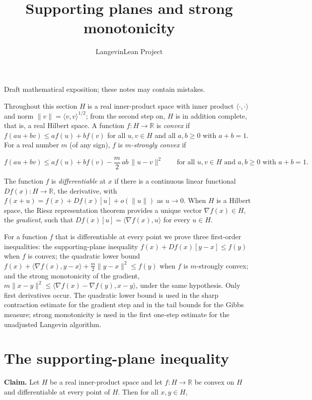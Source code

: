 \documentclass[11pt,a4paper]{article}
\title{\texorpdfstring{Supporting planes and strong monotonicity}{Supporting planes and strong monotonicity}}
\author{LangevinLean Project}
\date{}
\begin{document}
\maketitle
Draft mathematical exposition; these notes may contain mistakes.


Throughout this section \(H\) is a real inner-product space with inner product \(\langle\cdot,\cdot\rangle\) and norm \(\|v\|=\langle v,v\rangle^{1/2}\); from the second step on, \(H\) is in addition complete, that is, a real Hilbert space. A function \(f:H\to\mathbb R\) is \emph{convex} if \(f(au+bv)\le af(u)+bf(v)\) for all \(u,v\in H\) and all \(a,b\ge0\) with \(a+b=1\). For a real number \(m\) (of any sign), \(f\) is \emph{\(m\)-strongly convex} if


\[f(au+bv)\le af(u)+bf(v)-\frac m2\,ab\,\|u-v\|^2\qquad\text{for all }u,v\in H\text{ and }a,b\ge0\text{ with }a+b=1.\]


The function \(f\) is \emph{differentiable} at \(x\) if there is a continuous linear functional \(Df(x):H\to\mathbb R\), the derivative, with \(f(x+u)=f(x)+Df(x)[u]+o(\|u\|)\) as \(u\to0\). When \(H\) is a Hilbert space, the Riesz representation theorem provides a unique vector \(\nabla f(x)\in H\), the \emph{gradient}, such that \(Df(x)[u]=\langle\nabla f(x),u\rangle\) for every \(u\in H\).




For a function \(f\) that is differentiable at every point we prove three first-order inequalities: the supporting-plane inequality \(f(x)+Df(x)[y-x]\le f(y)\) when \(f\) is convex; the quadratic lower bound \(f(x)+\langle\nabla f(x),y-x\rangle+\frac m2\|y-x\|^2\le f(y)\) when \(f\) is \(m\)-strongly convex; and the strong monotonicity of the gradient, \(m\|x-y\|^2\le\langle\nabla f(x)-\nabla f(y),x-y\rangle\), under the same hypothesis. Only first derivatives occur. The quadratic lower bound is used in the sharp contraction estimate for the gradient step and in the tail bounds for the Gibbs measure; strong monotonicity is used in the first one-step estimate for the unadjusted Langevin algorithm.


\section{\texorpdfstring{The supporting-plane inequality}{The supporting-plane inequality}}


\textbf{Claim.} Let \(H\) be a real inner-product space and let \(f:H\to\mathbb R\) be convex on \(H\) and differentiable at every point of \(H\). Then for all \(x,y\in H\),
\end{document}
